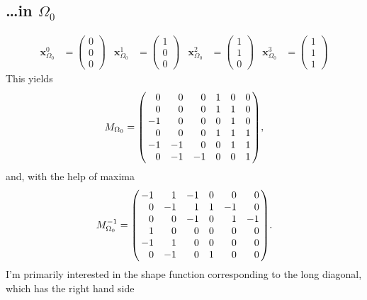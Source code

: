 \documentclass{scrartcl}
\newenvironment{Matrix}[1]{\left(\mspace{-6mu}\begin{array}{*{#1}{r}}}{\end{array}\mspace{-6mu}\right)}
\newenvironment{Matrix6}{\begin{Matrix}6}{\end{Matrix}}
\begin{document}
\subsection{\ldots in $\Omega_0$}
\begin{align}
  \mathbf x^0_{\Omega_0}&=\begin{pmatrix}0\\0\\0\end{pmatrix} &
  \mathbf x^1_{\Omega_0}&=\begin{pmatrix}1\\0\\0\end{pmatrix} &
  \mathbf x^2_{\Omega_0}&=\begin{pmatrix}1\\1\\0\end{pmatrix} &
  \mathbf x^3_{\Omega_0}&=\begin{pmatrix}1\\1\\1\end{pmatrix}
\end{align}
This yields
\begin{equation}
  M_{\Omega_0}=\begin{Matrix6}
     0 &  0 &  0 & 1 & 0 & 0 \\
     0 &  0 &  0 & 1 & 1 & 0 \\
    -1 &  0 &  0 & 0 & 1 & 0 \\
     0 &  0 &  0 & 1 & 1 & 1 \\
    -1 & -1 &  0 & 0 & 1 & 1 \\
     0 & -1 & -1 & 0 & 0 & 1
  \end{Matrix6},
\end{equation}
and, with the help of maxima
\begin{equation}
  M_{\Omega_0}^{-1}=\begin{Matrix6}
    -1 &  1 & -1 & 0 &  0 &  0 \\
     0 & -1 &  1 & 1 & -1 &  0 \\
     0 &  0 & -1 & 0 &  1 & -1 \\
     1 &  0 &  0 & 0 &  0 &  0 \\
    -1 &  1 &  0 & 0 &  0 &  0 \\
     0 & -1 &  0 & 1 &  0 &  0
  \end{Matrix6}.
\end{equation}
I'm primarily interested in the shape function corresponding to the long
diagonal, which has the right hand side
\end{document}
